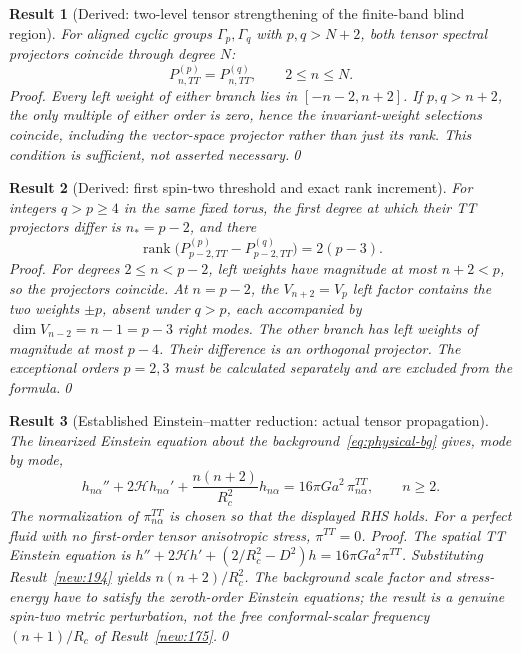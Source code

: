\documentclass[aps,prd,onecolumn,notitlepage,groupedaddress,11pt]{revtex4-2}
\newtheorem{result}{Result}
\begin{document}
\begin{result}[\textsf{Derived}: two-level tensor strengthening of the finite-band blind region]\label{new:197}
For aligned cyclic groups $\Gamma_p,\Gamma_q$ with $p,q>N+2$, both \emph{tensor} spectral projectors coincide through degree $N$:
\begin{equation}\label{eq:tt-blind}
 P_{n,TT}^{(p)}=P_{n,TT}^{(q)},\qquad 2\le n\le N.
\end{equation}
\textit{Proof.} Every left weight of either branch lies in $[-n-2,n+2]$. If $p,q>n+2$, the only multiple of either order is zero, hence the invariant-weight selections coincide, including the vector-space projector rather than just its rank. This condition is sufficient, not asserted necessary.\qed
\end{result}

\begin{result}[\textsf{Derived}: first spin-two threshold and exact rank increment]\label{new:198}
For integers $q>p\ge4$ in the same fixed torus, the first degree at which their TT projectors differ is $n_*=p-2$, and there
\begin{equation}\label{eq:tt-first-break}
 \operatorname{rank}\bigl(P_{p-2,TT}^{(p)}-P_{p-2,TT}^{(q)}\bigr)=2(p-3).
\end{equation}
\textit{Proof.} For degrees $2\le n<p-2$, left weights have magnitude at most $n+2<p$, so the projectors coincide. At $n=p-2$, the $V_{n+2}=V_p$ left factor contains the two weights $\pm p$, absent under $q>p$, each accompanied by $\dim V_{n-2}=n-1=p-3$ right modes. The other branch has left weights of magnitude at most $p-4$. Their difference is an orthogonal projector. The exceptional orders $p=2,3$ must be calculated separately and are excluded from the formula.\qed
\end{result}

\begin{result}[\textsf{Established Einstein--matter reduction}: actual tensor propagation]\label{new:199}
The linearized Einstein equation about the background~\eqref{eq:physical-bg} gives, mode by mode,
\begin{equation}\label{eq:tt-wave}
 h_{n\alpha}''+2\mathcal H h_{n\alpha}'
 +\frac{n(n+2)}{R_c^2}h_{n\alpha}
 =16\pi G a^2\,\pi_{n\alpha}^{TT},\qquad n\ge2.
\end{equation}
The normalization of $\pi_{n\alpha}^{TT}$ is chosen so that the displayed RHS holds. For a perfect fluid with no first-order tensor anisotropic stress, $\pi^{TT}=0$. \textit{Proof.} The spatial TT Einstein equation is $h''+2\mathcal H h'+(2/R_c^2-D^2)h=16\pi G a^2\pi^{TT}$. Substituting Result~\ref{new:194} yields $n(n+2)/R_c^2$. The background scale factor and stress-energy have to satisfy the zeroth-order Einstein equations; the result is a genuine spin-two metric perturbation, not the free conformal-scalar frequency $(n+1)/R_c$ of Result~\ref{new:175}.\qed
\end{result}
\end{document}
